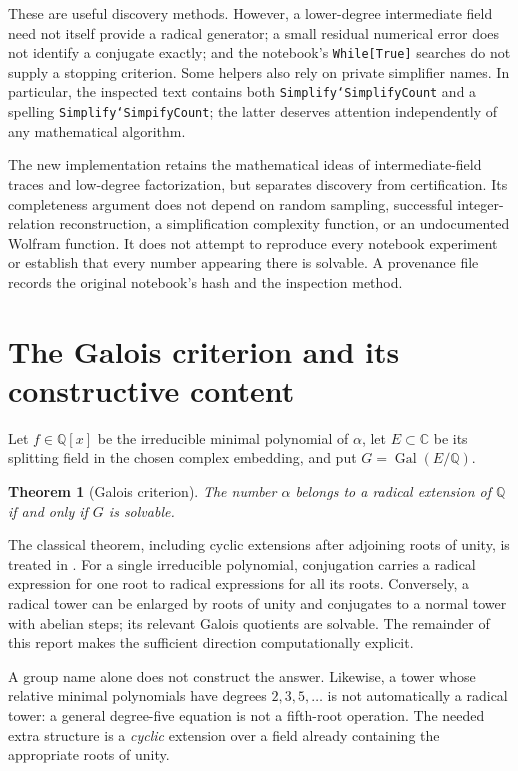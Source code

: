 \documentclass[11pt,a4paper]{article}
\newtheorem{theorem}{Theorem}[section]
\theoremstyle{definition}\newtheorem{definition}[theorem]{Definition}
\theoremstyle{remark}\newtheorem{remark}[theorem]{Remark}
\newcommand{\Q}{\mathbb Q}\newcommand{\C}{\mathbb C}
\newcommand{\Gal}{\operatorname{Gal}}\newcommand{\Aut}{\operatorname{Aut}}
\newcommand{\code}[1]{\texttt{#1}}
\begin{document}
These are useful discovery methods. However, a lower-degree intermediate
field need not itself provide a radical generator; a small residual numerical
error does not identify a conjugate exactly; and the notebook's
\code{While[True]} searches do not supply a stopping criterion. Some helpers
also rely on private simplifier names. In particular, the inspected text
contains both \code{Simplify`SimplifyCount} and a spelling
\code{Simplify`SimpifyCount}; the latter deserves attention independently of
any mathematical algorithm.

The new implementation retains the mathematical ideas of intermediate-field
traces and low-degree factorization, but separates discovery from certification.
Its completeness argument does not depend on random sampling, successful
integer-relation reconstruction, a simplification complexity function, or an
undocumented Wolfram function. It does not attempt to reproduce every
notebook experiment or establish that every number appearing there is
solvable. A provenance file records the original notebook's hash and the
inspection method.

\section{The Galois criterion and its constructive content}
Let $f\in\Q[x]$ be the irreducible minimal polynomial of $\alpha$, let
$E\subset\C$ be its splitting field in the chosen complex embedding, and put
$G=\Gal(E/\Q)$.

\begin{theorem}[Galois criterion]
The number $\alpha$ belongs to a radical extension of $\Q$ if and only if
$G$ is solvable.
\end{theorem}
The classical theorem, including cyclic extensions after adjoining roots of
unity, is treated in \cite[Proposition 5.27 and Theorem 5.34]{milne}. For a
single irreducible polynomial, conjugation carries a radical expression for
one root to radical expressions for all its roots. Conversely, a radical
tower can be enlarged by roots of unity and conjugates to a normal tower
with abelian steps; its relevant Galois quotients are solvable. The remainder
of this report makes the sufficient direction computationally explicit.

A group name alone does not construct the answer. Likewise, a tower whose
relative minimal polynomials have degrees $2,3,5,\ldots$ is not automatically
a radical tower: a general degree-five equation is not a fifth-root operation.
The needed extra structure is a \emph{cyclic} extension over a field already
containing the appropriate roots of unity.
\end{document}
